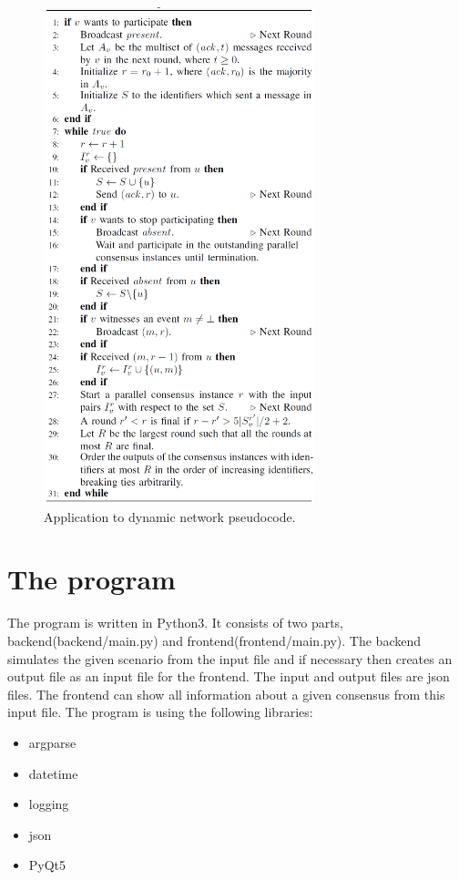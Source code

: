 \documentclass{article}
\begin{document}
\begin{figure}[hbt!]
    \centering
    \includegraphics[width=0.70\textwidth]{figures/dynamic_network.png}
    \caption{Application to dynamic network pseudocode.\label{dynamic_network_fig}}
\end{figure}

\newpage
\section{The program}
The program is written in Python3. It consists of two parts, backend(backend/main.py) and frontend(frontend/main.py). The backend simulates the given scenario from the input file and if necessary then creates an output file as an input file for the frontend.
The input and output files are json files. The frontend can show all information about a given consensus from this input file. The program is using the following libraries:

\begin{itemize}
  \item argparse
  \item datetime
  \item logging
  \item json
  \item PyQt5
\end{itemize}
\end{document}
